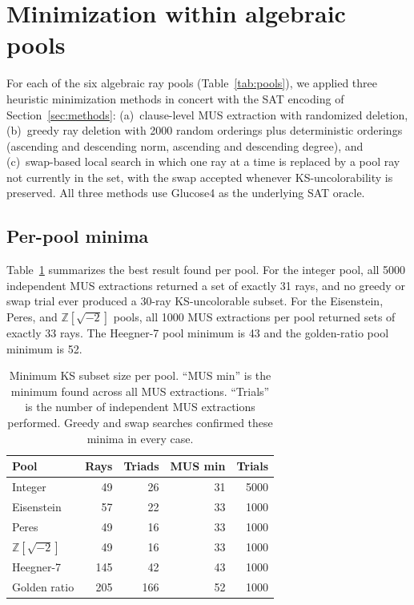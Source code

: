 \documentclass[twocolumn,pra,superscriptaddress,nofootinbib]{revtex4-2}
\newcommand{\Z}{\mathbb{Z}}
\begin{document}
\section{Minimization within algebraic pools}
\label{sec:exact}

For each of the six algebraic ray pools (Table~\ref{tab:pools}), we applied
three heuristic minimization methods in concert with the SAT encoding of
Section~\ref{sec:methods}: (a)~clause-level MUS extraction with randomized
deletion, (b)~greedy ray deletion with 2000 random orderings plus deterministic
orderings (ascending and descending norm, ascending and descending degree), and
(c)~swap-based local search in which one ray at a time is replaced by a pool
ray not currently in the set, with the swap accepted whenever KS-uncolorability
is preserved. All three methods use Glucose4 as the underlying SAT oracle.

\subsection{Per-pool minima}

Table~\ref{tab:minima} summarizes the best result found per pool. For the
integer pool, all 5000 independent MUS extractions returned a set of exactly 31
rays, and no greedy or swap trial ever produced a 30-ray KS-uncolorable subset.
For the Eisenstein, Peres, and $\Z[\sqrt{-2}]$ pools, all 1000 MUS extractions
per pool returned sets of exactly 33 rays. The Heegner-7 pool minimum is 43 and
the golden-ratio pool minimum is 52.

\begin{table}[t]
\centering
\caption{Minimum KS subset size per pool. ``MUS min'' is the minimum found
across all MUS extractions. ``Trials'' is the number of independent MUS
extractions performed. Greedy and swap searches confirmed these minima in
every case.}
\label{tab:minima}
\begin{tabular}{lrrrr}
\toprule
Pool & Rays & Triads & MUS min & Trials \\
\midrule
Integer & 49 & 26 & 31 & 5000 \\
Eisenstein & 57 & 22 & 33 & 1000 \\
Peres & 49 & 16 & 33 & 1000 \\
$\Z[\sqrt{-2}]$ & 49 & 16 & 33 & 1000 \\
Heegner-7 & 145 & 42 & 43 & 1000 \\
Golden ratio & 205 & 166 & 52 & 1000 \\
\bottomrule
\end{tabular}
\end{table}
\end{document}

